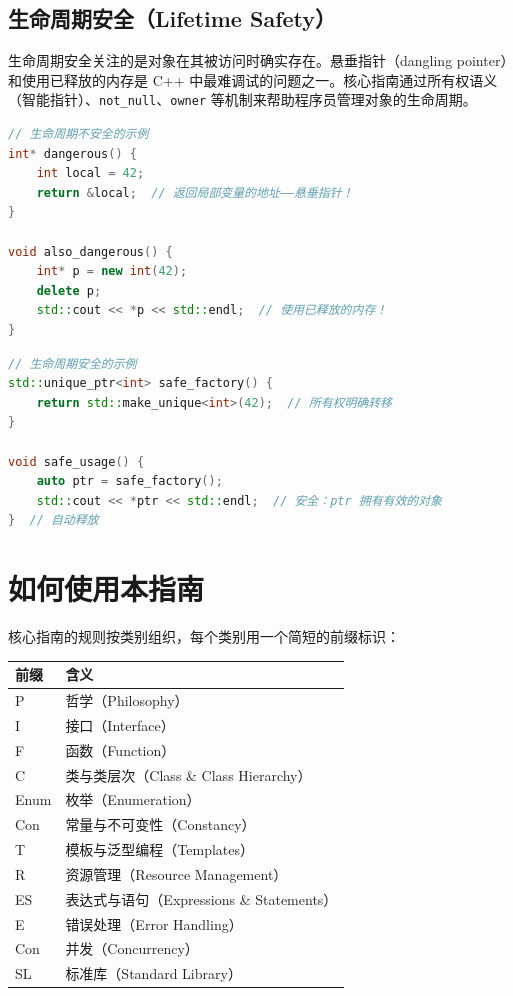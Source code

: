 \subsection{生命周期安全（Lifetime Safety）}

生命周期安全关注的是对象在其被访问时确实存在。悬垂指针（dangling pointer）和使用已释放的内存是 C++ 中最难调试的问题之一。核心指南通过所有权语义（智能指针）、\texttt{not\_null}、\texttt{owner} 等机制来帮助程序员管理对象的生命周期。

\begin{lstlisting}[language=C++]
// 生命周期不安全的示例
int* dangerous() {
    int local = 42;
    return &local;  // 返回局部变量的地址——悬垂指针！
}

void also_dangerous() {
    int* p = new int(42);
    delete p;
    std::cout << *p << std::endl;  // 使用已释放的内存！
}
\end{lstlisting}

\begin{lstlisting}[language=C++]
// 生命周期安全的示例
std::unique_ptr<int> safe_factory() {
    return std::make_unique<int>(42);  // 所有权明确转移
}

void safe_usage() {
    auto ptr = safe_factory();
    std::cout << *ptr << std::endl;  // 安全：ptr 拥有有效的对象
}  // 自动释放
\end{lstlisting}

\section{如何使用本指南}

核心指南的规则按类别组织，每个类别用一个简短的前缀标识：

\begin{table}[h]
\centering
\begin{tabular}{ll}
\hline
\textbf{前缀} & \textbf{含义} \\
\hline
P & 哲学（Philosophy） \\
I & 接口（Interface） \\
F & 函数（Function） \\
C & 类与类层次（Class \& Class Hierarchy） \\
Enum & 枚举（Enumeration） \\
Con & 常量与不可变性（Constancy） \\
T & 模板与泛型编程（Templates） \\
R & 资源管理（Resource Management） \\
ES & 表达式与语句（Expressions \& Statements） \\
E & 错误处理（Error Handling） \\
Con & 并发（Concurrency） \\
SL & 标准库（Standard Library） \\
\hline
\end{tabular}
\end{table}

